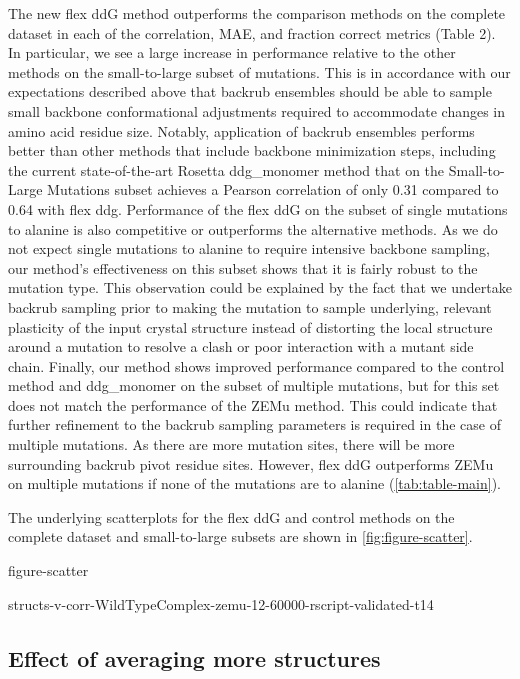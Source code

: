 The new flex ddG method outperforms the comparison methods on the complete dataset in each of the correlation, MAE, and fraction correct metrics (Table 2). In particular, we see a large increase in performance relative to the other methods on the small-to-large subset of mutations. This is in accordance with our expectations described above that backrub ensembles should be able to sample small backbone conformational adjustments required to accommodate changes in amino acid residue size. Notably, application of backrub ensembles performs better than other methods that include backbone minimization steps, including the current state-of-the-art Rosetta ddg\_monomer method that on the Small-to-Large Mutations subset achieves a Pearson correlation of only 0.31 compared to 0.64 with flex ddg.
Performance of the flex ddG on the subset of single mutations to alanine is also competitive or outperforms the alternative methods.
As we do not expect single mutations to alanine to require intensive backbone sampling, our method's effectiveness on this subset shows that it is fairly robust to the mutation type.
This observation could be explained by the fact that we undertake backrub sampling prior to making the mutation to sample underlying, relevant plasticity of the input crystal structure instead of distorting the local structure around a mutation to resolve a clash or poor interaction with a mutant side chain.
Finally, our method shows improved performance compared to the control method and ddg\_monomer on the subset of multiple mutations, but for this set does not match the performance of the ZEMu method.
This could indicate that further refinement to the backrub sampling parameters is required in the case of multiple mutations.
As there are more mutation sites, there will be more surrounding backrub pivot residue sites.
However, flex ddG outperforms ZEMu on multiple mutations if none of the mutations are to alanine (\cref{tab:table-main}).

The underlying scatterplots for the flex ddG and control methods on the complete dataset and small-to-large subsets are shown in \cref{fig:figure-scatter}. %

{figure-scatter}

{structs-v-corr-WildTypeComplex-zemu-12-60000-rscript-validated-t14}

\subsection{Effect of averaging more structures}

